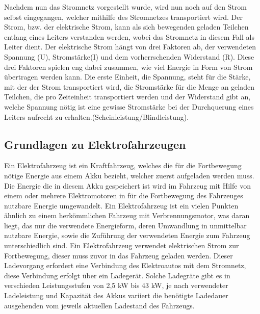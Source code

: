 Nachdem nun das Stromnetz vorgestellt wurde, wird nun noch auf den Strom selbst eingegangen, welcher mithilfe des Stromnetzes transportiert wird. Der Strom, bzw. der elektrische Strom, kann als sich bewegenden geladen Teilchen entlang eines Leiters verstanden werden, wobei das Stromnetz in diesem Fall als Leiter dient. Der elektrische Strom hängt von drei Faktoren ab, der verwendeten Spannung (U), Stromstärke(I) und dem vorherrschenden Widerstand (R). Diese drei Faktoren spielen eng dabei zusammen, wie viel Energie in Form von Strom übertragen werden kann. Die erste Einheit, die Spannung, steht für die Stärke, mit der der Strom transportiert wird, die Stromstärke für die Menge an geladen Teilchen, die pro Zeiteinheit transportiert werden und der Widerstand gibt an, welche Spannung nötig ist eine gewisse Stromstärke bei der Durchquerung eines Leiters aufrecht zu erhalten.(Scheinleistung/Blindleistung).

\subsection{Grundlagen zu Elektrofahrzeugen}
Ein Elektrofahrzeug ist ein Kraftfahrzeug, welches die für die Fortbewegung nötige Energie aus einem Akku bezieht, welcher zuerst aufgeladen werden muss. Die Energie die in diesem Akku gespeichert ist wird im Fahrzeug mit Hilfe von einem oder mehrere Elektromotoren in für die Fortbewegung des Fahrzeuges nutzbare Energie umgewandelt. Ein Elektrofahrzeug ist ein vielen Punkten ähnlich zu einem herkömmlichen Fahrzeug mit Verbrennungsmotor, was daran liegt, das nur die verwendete Energieform, deren Umwandlung in unmittelbar nutzbare Energie, sowie die Zuführung der verwendeten Energie zum Fahrzeug unterschiedlich sind. Ein Elektrofahrzeug verwendet elektrischen Strom zur Fortbewegung, dieser muss zuvor in das Fahrzeug geladen werden. Dieser Ladevorgang erfordert eine Verbindung des Elektroautos mit dem Stromnetz, diese Verbindung erfolgt über ein Ladegerät. Solche Ladegräte gibt es in verschieden Leistungsstufen von 2,5 kW bis 43 kW, je nach verwendeter Ladeleistung und Kapazität des Akkus variiert die benötigte Ladedauer ausgehenden vom jeweils aktuellen Ladestand des Fahrzeugs.

